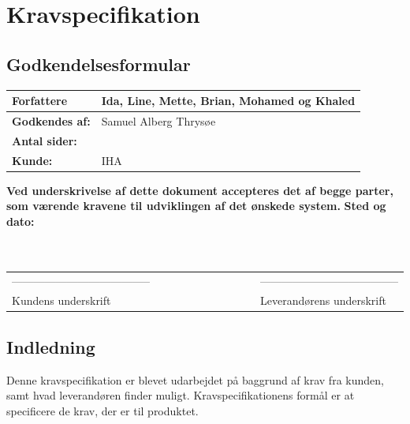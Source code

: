 \chapter{Kravspecifikation}
\section{Godkendelsesformular}
\begin{table}[h!]
\label{tab:tabel2}
\begin{tabular}{| l | >{\raggedright\arraybackslash}p{12cm} |}
   \hline
   \textbf{Forfattere} & Ida, Line, Mette, Brian, Mohamed og Khaled\\ \hline
   \textbf{Godkendes af:} & Samuel Alberg Thrysøe\\ \hline
   \textbf{Antal sider:} & \\ \hline
   \textbf{Kunde:} & IHA\\ \hline
\end{tabular}
\end{table}
\textbf{Ved underskrivelse af dette dokument accepteres det af begge parter, som værende kravene til udviklingen af det ønskede system.}
\newline
\textbf{Sted og dato:}\\
\\
\\
\begin{table}
[h!]
\begin{tabular}{ l lllllllll l}
--------------------------------------&&&&&&&&&&--------------------------------------\\ 
Kundens underskrift &&&&&&&&&&Leverandørens underskrift\\
\end{tabular}
\end{table}
\section{Indledning}
Denne kravspecifikation er blevet udarbejdet på baggrund af krav fra kunden, samt hvad leverandøren finder muligt. Kravspecifikationens formål er at specificere de krav, der er til produktet. 
\newpage

